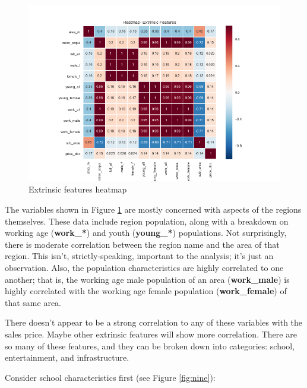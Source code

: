 \documentclass[12pt]{article}
\theoremstyle{plain} %
\theoremstyle{definition} %
\theoremstyle{remark} %
\begin{document}
\begin{figure}[h!]
\begin{center}
\includegraphics[width=15cm]{./output_images/extrinsic_heatmap.png}
\caption{Extrinsic features heatmap}
\label{fig:eight}
\end{center}
\end{figure}

The variables shown in Figure \ref{fig:eight} are mostly concerned with aspects of the regions themselves.  These data include region population, along with a breakdown on working age (\textbf{work\_*}) and youth (\textbf{young\_*}) populations.  Not surprisingly, there is moderate correlation between the region name and the area of that region.  This isn't, strictly-speaking, important to the analysis; it's just an observation.  Also, the population characteristics are highly correlated to one another; that is, the working age male population of an area (\textbf{work\_male}) is highly correlated with the working age female population (\textbf{work\_female}) of that same area.

There doesn't appear to be a strong correlation to any of these variables with the sales price.  Maybe other extrinsic features will show more correlation.  There are so many of these features, and they can be broken down into categories:  school, entertainment, and infrastructure.

Consider school characteristics first (see Figure \ref{fig:nine}):
\end{document}

